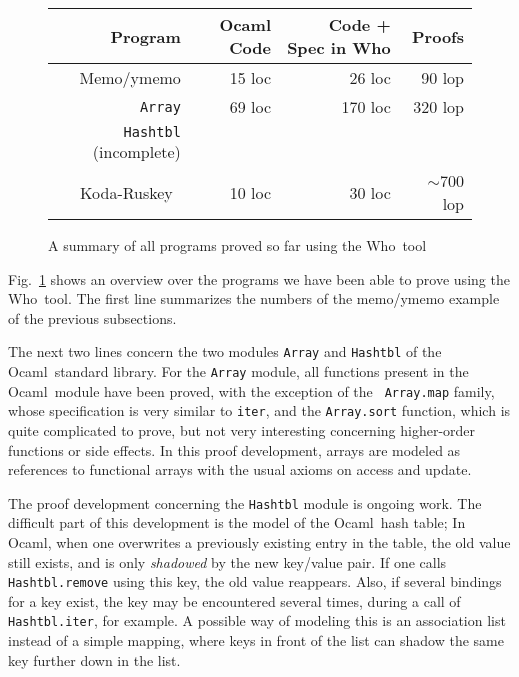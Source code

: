 \documentclass[a4paper]{llncs}
\newcommand{\who}{Who}
\newcommand{\ocaml}{Ocaml}
\begin{document}
\begin{figure}[tbp]
\begin{center}
    \begin{tabular}{ | r | r | r | r |}
    \hline
    Program & Ocaml Code & Code + Spec in \who & Proofs \\ \hline
    Memo/ymemo & 15 loc & 26 loc & 90 lop  \\ \hline
    {\tt Array} & 69 loc & 170 loc  & 320 lop  \\ \hline
    {\tt Hashtbl} (incomplete) & & &  \\ \hline
    Koda-Ruskey~\cite{KanigFilliatre09wml} & 10 loc & 30 loc & $\sim$700 lop  \\ \hline
    \end{tabular}
\end{center}
  \caption{A summary of all programs proved so far using the \who\ tool}
  \label{fig:whoproofs}
\end{figure}

Fig.~\ref{fig:whoproofs} shows an overview over the programs we have been able
to prove using the \who\ tool. The first line summarizes the numbers of the
memo/ymemo example of the previous subsections. 

The next two lines concern the two modules {\tt Array} and {\tt Hashtbl} of
the \ocaml\ standard library. For the {\tt Array} module, all functions
present in the \ocaml\ module have been proved, with the exception of the {\tt
Array.map} family, whose specification is very similar to {\tt iter}, and the
{\tt Array.sort} function, which is quite complicated to prove, but not very
interesting concerning higher-order functions or side effects. In this proof
development, arrays are modeled as references to functional arrays with the
usual axioms on access and update.

The proof development concerning the {\tt Hashtbl} module is ongoing work. The
difficult part of this development is the model of the \ocaml\ hash table; In
\ocaml, when one overwrites a previously existing entry in the table, the old
value still exists, and is only {\em shadowed} by the new key/value pair. If
one calls {\tt Hashtbl.remove} using this key, the old value reappears. Also,
if several bindings for a key exist, the key may be encountered several times,
during a call of {\tt Hashtbl.iter}, for example. A possible way of modeling
this is an association list instead of a simple mapping, where keys in front
of the list can shadow the same key further down in the list. 
\end{document}
